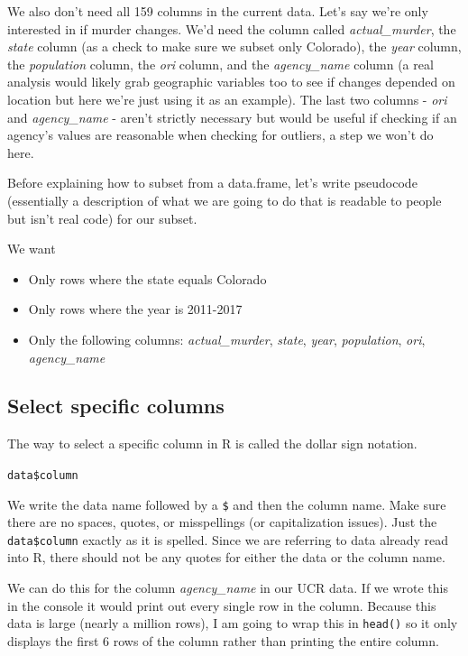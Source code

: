 \documentclass[
  12pt,
]{book}
\providecommand{\tightlist}{%
  \setlength{\itemsep}{0pt}\setlength{\parskip}{0pt}}
\begin{document}
We also don't need all 159 columns in the current data. Let's say we're only interested in if murder changes. We'd need the column called \emph{actual\_murder}, the \emph{state} column (as a check to make sure we subset only Colorado), the \emph{year} column, the \emph{population} column, the \emph{ori} column, and the \emph{agency\_name} column (a real analysis would likely grab geographic variables too to see if changes depended on location but here we're just using it as an example). The last two columns - \emph{ori} and \emph{agency\_name} - aren't strictly necessary but would be useful if checking if an agency's values are reasonable when checking for outliers, a step we won't do here.

Before explaining how to subset from a data.frame, let's write pseudocode (essentially a description of what we are going to do that is readable to people but isn't real code) for our subset.

We want

\begin{itemize}
\tightlist
\item
  Only rows where the state equals Colorado
\item
  Only rows where the year is 2011-2017
\item
  Only the following columns: \emph{actual\_murder}, \emph{state}, \emph{year}, \emph{population}, \emph{ori}, \emph{agency\_name}
\end{itemize}

\hypertarget{select-specific-columns}{%
\subsection{Select specific columns}\label{select-specific-columns}}

The way to select a specific column in R is called the dollar sign notation.

\texttt{data\$column}

We write the data name followed by a \texttt{\$} and then the column name. Make sure there are no spaces, quotes, or misspellings (or capitalization issues). Just the \texttt{data\$column} exactly as it is spelled. Since we are referring to data already read into R, there should not be any quotes for either the data or the column name.

We can do this for the column \emph{agency\_name} in our UCR data. If we wrote this in the console it would print out every single row in the column. Because this data is large (nearly a million rows), I am going to wrap this in \texttt{head()} so it only displays the first 6 rows of the column rather than printing the entire column.
\end{document}
